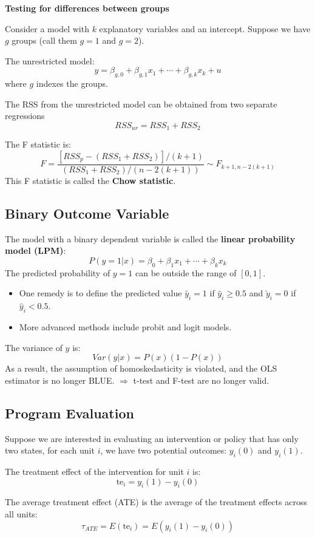 \documentclass[11pt,a4paper]{article}
\begin{document}
\textbf{Testing for differences between groups} \par
Consider a model with $k$ explanatory variables and an intercept. Suppose we have $g$ groups (call them $g=1$ and $g=2$). \par
The unrestricted model:
\[
y = \beta_{g,0} + \beta_{g,1} x_1 + \cdots + \beta_{g,k} x_k + u
\]
where $g$ indexes the groups. \par
The RSS from the unrestricted model can be obtained from two separate regressions
\[
RSS_{ur} = RSS_1 + RSS_2
\]

The F statistic is:
\[
F = \frac{[RSS_p - (RSS_1 + RSS_2)]/(k + 1)}{(RSS_1 + RSS_2)/(n - 2(k + 1))} \sim F_{k+1, n-2(k+1)}
\]
This F statistic is called the \textbf{Chow statistic}.

\subsection{Binary Outcome Variable}
The model with a binary dependent variable is called the \textbf{linear probability model (LPM)}:
\[
P(y = 1 | x) = \beta_0 + \beta_1 x_1 + \cdots + \beta_k x_k
\]
The predicted probability of $y=1$ can be outside the range of $[0,1]$. \par
\begin{itemize}
    \item One remedy is to define the predicted value $\tilde{y_i} = 1$ if $\hat{y}_i \geqslant 0.5$ and $\tilde{y}_i = 0$ if $\hat{y}_i < 0.5$.
    \item More advanced methods include probit and logit models.
\end{itemize}

The variance of $y$ is:
\[
Var(y|x) = P(x) (1 - P(x))
\]
As a result, the assumption of homoskedasticity is violated, and the OLS estimator is no longer BLUE. $\Rightarrow$ t-test and F-test are no longer valid. \par

\subsection{Program Evaluation}
Suppose we are interested in evaluating an intervention or policy that has only two states, for each unit $i$, we have two potential outcomes: $y_i(0)$ and $y_i(1)$. \par
The treatment effect of the intervention for unit $i$ is:
\[
\text{te}_i = y_i(1) - y_i(0)
\]

The average treatment effect (ATE) is the average of the treatment effects across all units:
\[
\tau_{ATE} = E(\text{te}_i) = E(y_i(1) - y_i(0))
\]
\end{document}
